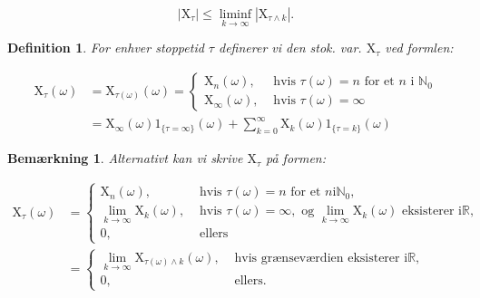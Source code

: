 \documentclass{article}
\newcommand{\1}{\mathbbm{1}}
\theoremstyle{boxed}
\newtheorem{definition}[theorem]{Definition}
\newtheorem{remark}[theorem]{Bemærkning}
\begin{document}
$$
\left|\mathrm{X}_\tau\right| \leq \liminf _{k \rightarrow \infty}\left|\mathrm{X}_{\tau \wedge k}\right| .
$$
\begin{theorem-box}
    \begin{definition}
        For enhver stoppetid $\tau$ definerer vi den stok. var. $\mathrm{X}_\tau$ ved formlen:

$$
\begin{aligned}
\mathrm{X}_\tau(\omega) & =\mathrm{X}_{\tau(\omega)}(\omega)= \begin{cases}\mathrm{X}_n(\omega), & \text { hvis } \tau(\omega)=n \text { for et } n \text { i } \mathbb{N}_0 \\
\mathrm{X}_{\infty}(\omega), & \text { hvis } \tau(\omega)=\infty\end{cases} \\
& =\mathrm{X}_{\infty}(\omega) 1_{\{\tau=\infty\}}(\omega)+\sum_{k=0}^{\infty} \mathrm{X}_k(\omega) 1_{\{\tau=k\}}(\omega)
\end{aligned}
$$
    \end{definition}
\end{theorem-box}
\begin{remark}
    Alternativt kan vi skrive $\mathrm{X}_\tau$ på formen:

$$
\begin{aligned}
\mathrm{X}_\tau(\omega) & = \begin{cases}\mathrm{X}_n(\omega), & \text { hvis } \tau(\omega)=n \text { for et } n \mathrm{i} \mathbb{N}_0, \\
\lim _{k \rightarrow \infty} \mathrm{X}_k(\omega), & \text { hvis } \tau(\omega)=\infty, \text { og } \lim _{k \rightarrow \infty} \mathrm{X}_k(\omega) \text { eksisterer } \mathrm{i} \mathbb{R}, \\
0, & \text { ellers }\end{cases} \\
& = \begin{cases}\lim _{k \rightarrow \infty} \mathrm{X}_{\tau(\omega) \wedge k}(\omega), & \text { hvis grænseværdien eksisterer } \mathrm{i} \mathbb{R}, \\
0, & \text { ellers. }\end{cases}
\end{aligned}
$$

\end{remark}
\end{document}
